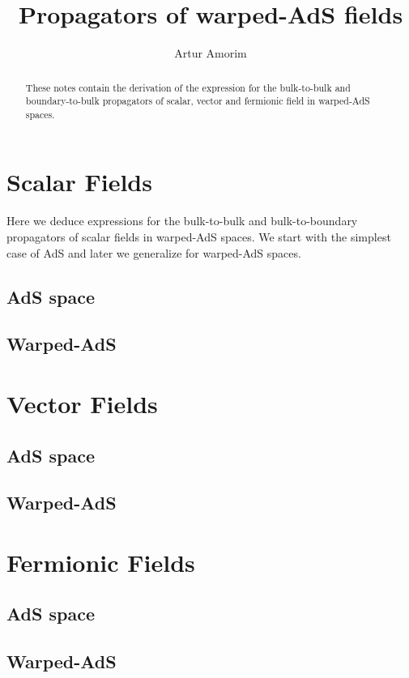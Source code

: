\documentclass[12pt,a4paper]{article}
\begin{document}
\title{Propagators of warped-AdS fields}
\author{Artur Amorim}

\begin{abstract}
    These notes contain the derivation of the expression for the bulk-to-bulk and boundary-to-bulk propagators of scalar, vector and fermionic field in warped-AdS spaces.
\end{abstract}
\maketitle

\section{Scalar Fields}
Here we deduce expressions for the bulk-to-bulk and bulk-to-boundary propagators of scalar fields in warped-AdS spaces. We start with the simplest case of AdS and later we generalize for warped-AdS spaces.
\subsection{AdS space}
\subsection{Warped-AdS}
\section{Vector Fields}
\subsection{AdS space}
\subsection{Warped-AdS}
\section{Fermionic Fields}
\subsection{AdS space}
\subsection{Warped-AdS}
\end{document}
